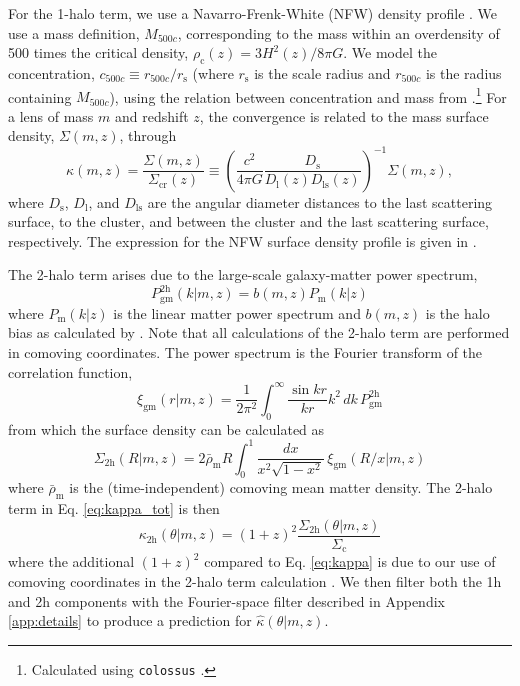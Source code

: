 \documentclass[preprint2]{aastex63}
\begin{document}
For the 1-halo term, we use a Navarro-Frenk-White (NFW) density profile \citep{NFW}. We use a mass definition, $M_{500c}$, corresponding to the mass within an overdensity of 500 times the critical density, $\rho_\mathrm{c}(z)=3H^2(z)/8\pi G$.
We model the concentration, $c_{500c}\equiv r_{500c}/r_\mathrm{s}$ (where $r_\mathrm{s}$ is the scale radius and $r_{500c}$ is the radius containing $M_{500c}$), using the relation between concentration and mass from \cite{diemer19}.\footnote{Calculated using \texttt{colossus} \citep[\url{https://bdiemer.bitbucket.io/colossus/}]{colossus}.} For a lens of mass $m$ and redshift $z$, the convergence is related to the mass surface density, $\Sigma(m,z)$, through
\begin{equation}\label{eq:kappa}
    \kappa(m,z)=\frac{\Sigma(m,z)}{\Sigma_\mathrm{cr}(z)}
    \equiv
    \left(
        \frac{c^2}{4\pi G}\frac{D_\mathrm{s}}{D_\mathrm{l}(z)D_\mathrm{ls}(z)}
    \right)^{-1}
    \Sigma(m,z),
\end{equation}
where $D_\mathrm{s}$, $D_\mathrm{l}$, and $D_\mathrm{ls}$ are the angular diameter distances to the last scattering surface, to the cluster, and between the cluster and the last scattering surface, respectively.
The expression for the NFW surface density profile is given in \cite{wright00}.


The 2-halo term arises due to the large-scale galaxy-matter power spectrum,
\begin{equation}\label{eq:Pgm_2h}
    P_\mathrm{gm}^\mathrm{2h}(k|m,z) = b(m,z)P_\mathrm{m}(k|z)
\end{equation}
where $P_\mathrm{m}(k|z)$ is the linear matter power spectrum and $b(m,z)$ is the halo bias as calculated by \cite{tinker10}. Note that all calculations of the 2-halo term are performed in comoving coordinates. The power spectrum is the Fourier transform of the correlation function,
\begin{equation}\label{eq:xi}
    \xi_\mathrm{gm}(r|m,z) = 
    \frac1{2\pi^2}\int_0^\infty \frac{\sin kr}{kr}k^2\,dk\, P_\mathrm{gm}^\mathrm{2h}
\end{equation}
from which the surface density can be calculated as
\begin{equation}\label{eq:sigma}
    \Sigma_\mathrm{2h}(R|m,z) = 2\bar\rho_\mathrm{m}R
    \int_0^1\frac{dx}{x^2\sqrt{1-x^2}}\,\xi_\mathrm{gm}(R/x|m,z)
\end{equation}
where $\bar\rho_\mathrm{m}$ is the (time-independent) comoving mean matter density. The 2-halo term in Eq. \ref{eq:kappa_tot} is then
\begin{equation}
    \kappa_\mathrm{2h}(\theta|m,z) = (1+z)^2
        \frac{\Sigma_\mathrm{2h}(\theta|m,z)}{\Sigma_\mathrm{c}}
\end{equation}
where the additional $(1+z)^2$ compared to Eq. \ref{eq:kappa} is due to our use of comoving coordinates in the 2-halo term calculation \citep[see, e.g., ][]{dvornik18}.
We then filter both the 1h and 2h components with the Fourier-space filter described in Appendix \ref{app:details} to produce a prediction for $\hat\kappa(\theta|m,z)$.
\end{document}
